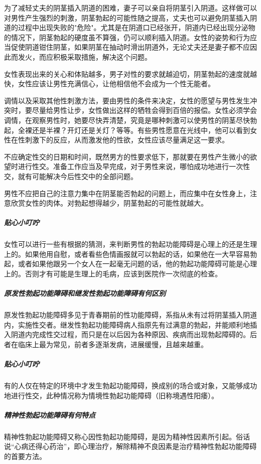 为了减轻丈夫的阴茎插入阴道的困难，妻子可以亲自将阴茎引入阴道。这样做可以对男性产生强烈的刺激，阴茎勃起的可能性随之提高，丈夫也可以避免阴茎插入阴道的过程中出现失败的"危险"。尤其是在阴道口已经张开，阴道内已经出现分泌物的情况下，阴茎勃起的硬度虽不算强，仍可以顺利插入阴道。女性的姿势和行为应当促使阴道钳住阴茎，如果阴茎在抽动时滑出阴道外，无论丈夫还是妻子都不应因此而发火，而应积极采取措施，解决这个问题。

女性表现出来的关心和体贴越多，男子对性的要求就越迫切，阴茎勃起的速度就越快，女性应该让男性充满信心，让他相信他不会成为一个性无能者。

调情以及采取其他性刺激方法，要由男性的条件来决定，女性的愿望与男性发生冲突时，要尽量给男性让步，女性做出这样的牺牲会得到百倍的报偿。女性必须学会调情，在观察男性时，她要尽快弄清楚，究竟是哪种刺激可以使男性的阴茎尽快勃起，全裸还是半裸？开灯还是关灯？等等。有些男性愿意在光线中，他可以看到女性在性刺激下的反应，从而激发他的性欲，女性应该尽量满足这一要求。

不应确定性交的日期和时间，既然男方的性要求低下，那就要在男性产生微小的欲望时进行性交。准备工作应当及早完成，对于男性来说，哪怕成功地进行一次性交，就有可能解决今后性交中的全部问题。

男性不应把自己的注意力集中在阴茎能否勃起的问题上，而应集中在女性身上，注意欣赏女性的肉体。对勃起想得越少，阴茎勃起的可能性就越大。

\subparagraph{贴心小叮咛}

女性可以进行一些有根据的猜测，来判断男性的勃起功能障碍是心理上的还是生理上的。如果他用自慰，或者看些色情画报就可以勃起的话，如果他在一大早容易勃起，或者如果他跟另一个女人在一起毫无问题的话，他的勃起功能障碍可能是心理上的。否则才有可能是生理上的毛病，应该到医院作一次彻底的检查。

\subparagraph{原发性勃起功能障碍和继发性勃起功能障碍有何区别}

原发性勃起功能障碍多见于青春期前的性功能障碍，系指从未有过将阴茎插入阴道内，实施性交者。继发性勃起功能障碍病人指原先有过满意的勃起，并能顺利地插入阴道内完成性交过程，而只是在以后因为各种原因、疾病而出现勃起障碍的。后者在临床上最为常见，前者多逐渐发病，进展缓慢，且越来越重。

\subparagraph{贴心小叮咛}

有的人仅在特定的环境中才发生勃起功能障碍，换成别的场合或对象，又能够成功地进行性交，此种情况称为情境性勃起功能障碍（旧称境遇性阳痿）。

\subparagraph{精神性勃起功能障碍有何特点}

精神性勃起功能障碍又称心因性勃起功能障碍，是因为精神性因素所引起。俗话说“心病还得心药治”，即心理治疗，解除精神不良因素是治疗精神性勃起功能障碍的首要方法。

